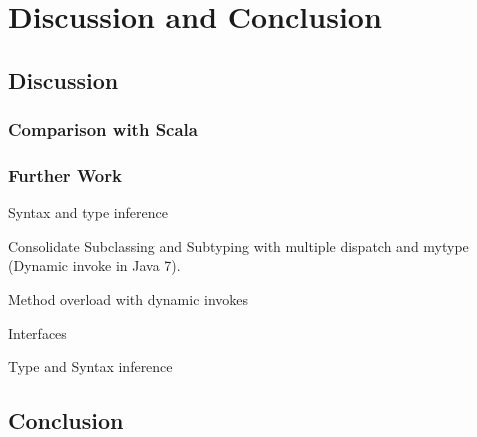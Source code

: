 \part{Discussion and Conclusion}
\chapter{Discussion}
\label{ctr:discussion}
\section{Comparison with Scala}
\label{sec:comparisonScala}

\section{Further Work}
\label{sec:furtherWork}
Syntax and type inference


Consolidate Subclassing and Subtyping with multiple dispatch and mytype (Dynamic invoke in Java 7).

Method overload with dynamic invokes

Interfaces

Type and Syntax inference


\chapter{Conclusion}
\label{ctr:conclusion}
